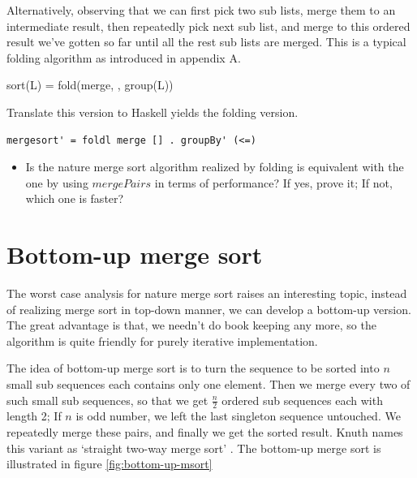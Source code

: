 \documentclass[b5paper]{article}
\begin{document}
Alternatively, observing that we can first pick two sub lists, merge them to an intermediate result, then repeatedly
pick next sub list, and merge to this ordered result we've gotten so far until all the rest sub lists are merged.
This is a typical folding algorithm as introduced in appendix A.

\be
sort(L) = fold(merge, \phi, group(L))
\ee

Translate this version to Haskell yields the folding version.

\lstset{language=Haskell}
\begin{lstlisting}
mergesort' = foldl merge [] . groupBy' (<=)
\end{lstlisting}

\begin{Exercise}
\begin{itemize}
  \item Is the nature merge sort algorithm realized by folding is equivalent with the one by using $mergePairs$ in terms
of performance? If yes, prove it; If not, which one is faster?
\end{itemize}
\end{Exercise}

\section{Bottom-up merge sort}
The worst case analysis for nature merge sort raises an interesting topic, instead of realizing merge sort in
top-down manner, we can develop a bottom-up version. The great advantage is that, we needn't do book keeping
any more, so the algorithm is quite friendly for purely iterative implementation.

The idea of bottom-up merge sort is to turn the sequence to be sorted into $n$ small sub sequences each contains
only one element. Then we merge every two of such small sub sequences, so that we get $\frac{n}{2}$ ordered
sub sequences each with length 2; If $n$ is odd number, we left the last singleton sequence untouched.
We repeatedly merge these pairs, and finally we get the sorted result. Knuth names this variant as
`straight two-way merge sort' \cite{TAOCP}. The bottom-up merge sort is illustrated in figure \ref{fig:bottom-up-msort}
\end{document}

